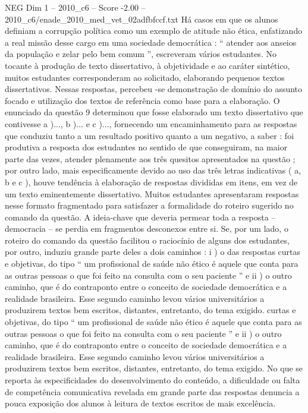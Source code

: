 \begin{textsample}{NEG Dim 1 – 2010\_c6 – Score -2.00 – 2010\_c6/enade\_2010\_med\_vet\_02adfbfccf.txt}
Há casos em que os alunos definiam a corrupção política como um exemplo de atitude não ética, enfatizando a real missão desse cargo em uma sociedade democrática : “ atender aos anseios da população e zelar pelo bem comum ”, escreveram vários estudantes.
No tocante à produção de texto dissertativo, à objetividade e ao caráter sintético, muitos estudantes corresponderam ao solicitado, elaborando pequenos textos dissertativos.
Nessas respostas, percebeu -se demonstração de domínio do assunto focado e utilização dos textos de referência como base para a elaboração.
O enunciado da questão 9 determinou que fosse elaborado um texto dissertativo que contivesse a )..., b )... e c )..., fornecendo um encaminhamento para as respostas que conduziu tanto a um resultado positivo quanto a um negativo, a saber : foi produtiva a resposta dos estudantes no sentido de que conseguiram, na maior parte das vezes, atender plenamente aos três quesitos apresentados na questão ; por outro lado, mais especificamente devido ao uso das três letras indicativas ( a, b e c ), houve tendência à elaboração de respostas divididas em itens, em vez de um texto eminentemente dissertativo.
Muitos estudantes apresentaram respostas nesse formato fragmentado para satisfazer a formalidade do roteiro sugerido no comando da questão.
A ideia-chave que deveria permear toda a resposta – democracia – se perdia em fragmentos desconexos entre si.
Se, por um lado, o roteiro do comando da questão facilitou o raciocínio de alguns dos estudantes, por outro, induziu grande parte deles a dois caminhos : i ) o das respostas curtas e objetivas, do tipo “ um profissional de saúde não ético é aquele que conta para as outras pessoas o que foi feito na consulta com o seu paciente ” e ii ) o outro caminho, que é do contraponto entre o conceito de sociedade democrática e a realidade brasileira.
Esse segundo caminho levou vários universitários a produzirem textos bem escritos, distantes, entretanto, do tema exigido. curtas e objetivas, do tipo “ um profissional de saúde não ético é aquele que conta para as outras pessoas o que foi feito na consulta com o seu paciente ” e ii ) o outro caminho, que é do contraponto entre o conceito de sociedade democrática e a realidade brasileira.
Esse segundo caminho levou vários universitários a produzirem textos bem escritos, distantes, entretanto, do tema exigido.
No que se reporta às especificidades do desenvolvimento do conteúdo, a dificuldade ou falta de competência comunicativa revelada em grande parte das respostas denuncia a pouca exposição dos alunos à leitura de textos escritos de mais excelência.

\end{textsample}

